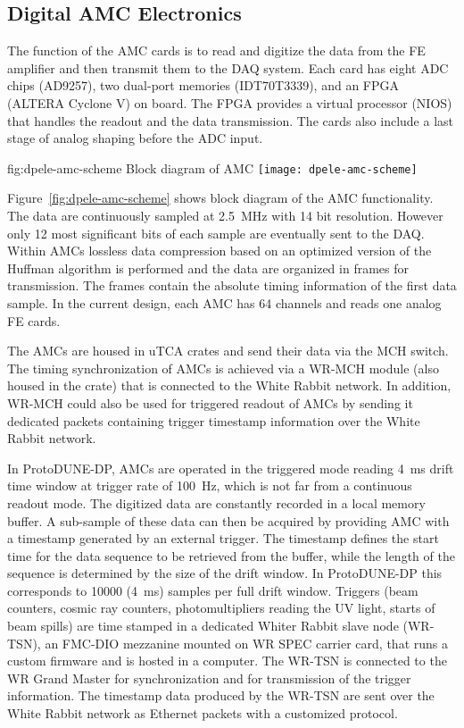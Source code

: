 \subsection{Digital AMC Electronics}
\label{sec:fddp-tpc-elec-design-amc}

The function of the AMC cards is to read and digitize the data from the FE amplifier and then transmit them to the DAQ system. Each card has eight ADC chips (AD9257), two dual-port memories (IDT70T3339), and an FPGA (ALTERA Cyclone V) on board. The FPGA provides a virtual processor (NIOS) that handles the readout and the data transmission.  The cards also include a last stage of analog shaping before the ADC input.

\begin{dunefigure}{fig:dpele-amc-scheme}
{Block diagram of AMC}
\texttt{[image: dpele-amc-scheme]}
\end{dunefigure}

Figure~\ref{fig:dpele-amc-scheme} shows block diagram of the AMC functionality. The data are continuously sampled at \SI{2.5}{\MHz} with \num{14} bit resolution. However only \num{12} most significant bits of each sample are eventually sent to the DAQ. Within AMCs lossless data compression based on an optimized version of the Huffman algorithm is performed and the data are organized in frames for transmission. The frames contain the absolute timing information of the first data sample.  In the current design, each AMC has 64 channels and reads one analog FE cards.

The AMCs are housed in uTCA crates and send their data via the MCH switch. The timing synchronization of AMCs is achieved via a WR-MCH module (also housed in the crate) that is connected to the White Rabbit network. In addition, WR-MCH could also be used for triggered readout of AMCs by sending it dedicated packets containing trigger timestamp information over the White Rabbit network.

In ProtoDUNE-DP, AMCs are operated in the triggered mode reading \SI{4}{\milli\second} drift time window at trigger rate of \SI{100}{Hz}, which is not far from a continuous readout mode. The digitized data are constantly recorded in a local memory buffer. A sub-sample of these data can then be acquired by providing AMC with a timestamp generated by an external trigger. The timestamp defines the start time for the data sequence to be retrieved from the buffer, while the length of the sequence is determined by the size of the drift window. In ProtoDUNE-DP this corresponds to \num{10000} (\SI{4}{\milli\second}) samples per full drift window.  Triggers (beam counters, cosmic ray counters, photomultipliers reading the UV light, starts of beam spills) are time stamped in a dedicated Whiter Rabbit slave node (WR-TSN), an FMC-DIO mezzanine mounted on WR SPEC carrier card, that runs a custom firmware and is hosted in a computer. The WR-TSN is connected to the WR Grand Master for synchronization and for transmission of the trigger information. The timestamp data produced by the WR-TSN are sent over the White Rabbit network as Ethernet packets with a customized protocol. 
   
